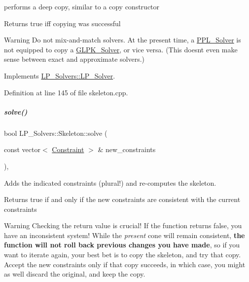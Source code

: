 performs a deep copy, similar to a copy constructor 

\begin{DoxyReturn}{Returns}
{\ttfamily true} iff copying was successful 
\end{DoxyReturn}
\begin{DoxyWarning}{Warning}
Do not mix-\/and-\/match solvers. At the present time, a \hyperlink{group___c_l_s_solvers_class_l_p___solvers_1_1_p_p_l___solver}{P\+P\+L\+\_\+\+Solver} is not equipped to copy a \hyperlink{group___c_l_s_solvers_class_l_p___solvers_1_1_g_l_p_k___solver}{G\+L\+P\+K\+\_\+\+Solver}, or vice versa. (This doesn\textquotesingle{}t even make sense between exact and approximate solvers.) 
\end{DoxyWarning}


Implements \hyperlink{group___c_l_s_solvers_a36c14a88e9d3ae9d9321acc7877236d0}{L\+P\+\_\+\+Solvers\+::\+L\+P\+\_\+\+Solver}.



Definition at line 145 of file skeleton.\+cpp.

\mbox{\label{group___c_l_s_solvers_adf50f125e2bfc6834fdd93e3fff22c48}} 
\subparagraph{\texorpdfstring{solve()}{solve()}\hspace{0.1cm}{\footnotesize\ttfamily [1/2]}}
{\footnotesize\ttfamily bool L\+P\+\_\+\+Solvers\+::\+Skeleton\+::solve (\begin{DoxyParamCaption}\item[{const vector$<$ \hyperlink{group___c_l_s_solvers_class_l_p___solvers_1_1_constraint}{Constraint} $>$ \&}]{new\+\_\+constraints }\end{DoxyParamCaption})\hspace{0.3cm}{\ttfamily [override]}, {\ttfamily [virtual]}}



Adds the indicated constraints (plural!) and re-\/computes the skeleton. 

\begin{DoxyReturn}{Returns}
{\ttfamily true} if and only if the new constraints are consistent with the current constraints
\end{DoxyReturn}
\begin{DoxyWarning}{Warning}
Checking the return value is crucial! If the function returns {\ttfamily false}, you have an inconsistent system! While the {\itshape present} cone will remain consistent, {\bfseries the function will not roll back previous changes you have made}, so if you want to iterate again, your best bet is to copy the skeleton, and try that copy. Accept the new constraints only if that copy succeeds, in which case, you might as well discard the original, and keep the copy. 
\end{DoxyWarning}


